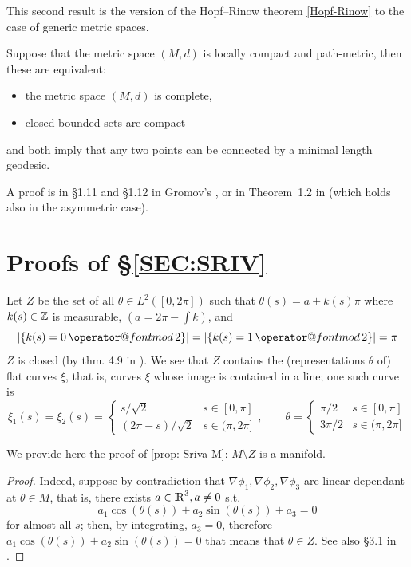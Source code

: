 \documentclass[twoside,a4paper,english]{article}
\makeatletter
\def\mod{\mathop{\operator@font mod}\nolimits}
\makeatother
\begin{document}
\medskip


This second result is the version of the Hopf--Rinow theorem
\ref{Hopf-Rinow} to the case of generic metric spaces.
\begin{Theorem}\label{metric Hopf-Rinow}
   Suppose that the metric space
   $(M,d)$ is locally compact and path-metric, then these are equivalent:
   \begin{itemize}
   \item the metric space $(M,d)$ is complete,
   \item closed bounded sets are compact
 \end{itemize}
 and both imply that any two points can be connected by a minimal length
 geodesic.
\end{Theorem}
A proof is in \S1.11 and \S1.12 in Gromov's  \cite{Gromov:met},
or in Theorem~1.2 in   \cite{ACM:Asym} (which holds
also in the asymmetric case).

\section{Proofs of \S{\protect\ref{SEC:SRIV}}}
\label{sec: proofs Sriva}

Let $Z$ be the set of all $\theta\in L^2([0,2\pi])$ such that
$\theta(s)=a+k(s) \pi$ where $k(s)\in {\protect\mathbb{Z}}$ is
measurable, $(a=2\pi-\int k)$,
and \[|\{k(s)=0 \mod 2\} | = |\{k(s)=1 \mod 2\} | = \pi\]
$Z$ is closed (by thm. 4.9 in \cite{Brezis}).
We see that $Z$ contains the (representations $\theta$ of) flat curves
$\xi$, that is, curves $\xi$ whose image is contained in a line;
one such curve is 
\[  \xi_1(s)= \xi_2(s) = 
\begin{cases}
  s/\sqrt 2 & s\in[0,\pi] \\
  (2\pi-s)/\sqrt 2 & s\in(\pi,2\pi]
\end{cases}
,\qquad
\theta= 
\begin{cases}
  \pi/2 & s\in[0,\pi] \\
  3\pi/2& s\in(\pi,2\pi]
\end{cases}
\]

We provide here the proof of
\ref{prop: Sriva M}: $M\setminus Z$ is a manifold.
\begin{proof}
  Indeed, suppose by contradiction that
  $\nabla \phi_1  , \nabla \phi_2, \nabla \phi_3$
  are linear dependant at $\theta\in M$, 
  that is, there exists $a\in{\protect\mathrm{l\hskip-0.15em R}}^3,a\neq 0$ s.t.
  \[a_1 \cos(\theta(s))+a_2 \sin(\theta(s)) + a_3 = 0\]
  for almost all $s$; then, by integrating, $a_3 = 0$,
  therefore $a_1 \cos(\theta(s))+a_2 \sin(\theta(s)) = 0$ that means
  that $\theta\in Z$.
  See also \S3.1 in  \cite{Srivastava:AnalPlan}.
\end{proof}
\end{document}
